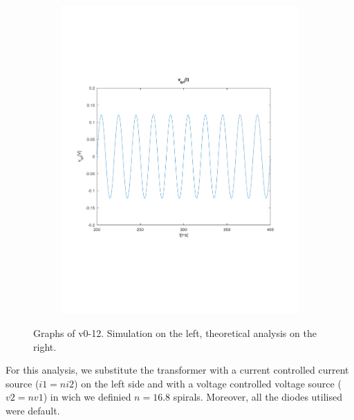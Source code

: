 \begin{figure}[h]
\begin{subfigure}{0.23\textwidth}
        \includegraphics[width=1.5\linewidth, clip]{../mat/vo.pdf}
        \label{fig:PSciclo}
    \end{subfigure}

    \caption{\small Graphs of v0-12. Simulation on the left, theoretical analysis on the right.}
    \label{maquina}
\end{figure}

For this analysis, we substitute the transformer with a current controlled current source ($i1 = n i2$)
on the left side and with a voltage controlled voltage source ($v2 = n v1$) in wich we definied $n=16.8$ spirals.
Moreover, all the diodes utilised were default.